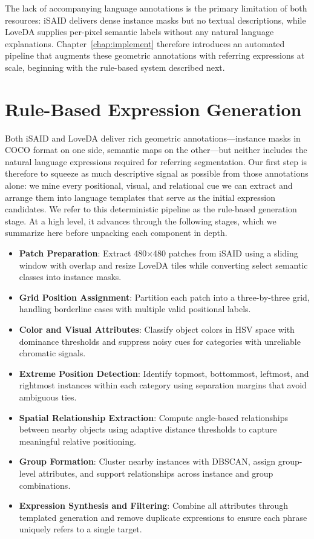 The lack of accompanying language annotations is the primary limitation of both resources: iSAID delivers dense instance masks but no textual descriptions, while LoveDA supplies per-pixel semantic labels without any natural language explanations. Chapter~\ref{chap:implement} therefore introduces an automated pipeline that augments these geometric annotations with referring expressions at scale, beginning with the rule-based system described next.

\section{Rule-Based Expression Generation}

Both iSAID and LoveDA deliver rich geometric annotations—instance masks in COCO format on one side, semantic maps on the other—but neither includes the natural language expressions required for referring segmentation. Our first step is therefore to squeeze as much descriptive signal as possible from those annotations alone: we mine every positional, visual, and relational cue we can extract and arrange them into language templates that serve as the initial expression candidates. We refer to this deterministic pipeline as the rule-based generation stage. At a high level, it advances through the following stages, which we summarize here before unpacking each component in depth.

\begin{itemize}
\item \textbf{Patch Preparation}: Extract 480$\times$480 patches from iSAID using a sliding window with overlap and resize LoveDA tiles while converting select semantic classes into instance masks.
\item \textbf{Grid Position Assignment}: Partition each patch into a three-by-three grid, handling borderline cases with multiple valid positional labels.
\item \textbf{Color and Visual Attributes}: Classify object colors in HSV space with dominance thresholds and suppress noisy cues for categories with unreliable chromatic signals.
\item \textbf{Extreme Position Detection}: Identify topmost, bottommost, leftmost, and rightmost instances within each category using separation margins that avoid ambiguous ties.
\item \textbf{Spatial Relationship Extraction}: Compute angle-based relationships between nearby objects using adaptive distance thresholds to capture meaningful relative positioning.
\item \textbf{Group Formation}: Cluster nearby instances with DBSCAN, assign group-level attributes, and support relationships across instance and group combinations.
\item \textbf{Expression Synthesis and Filtering}: Combine all attributes through templated generation and remove duplicate expressions to ensure each phrase uniquely refers to a single target.
\end{itemize}


